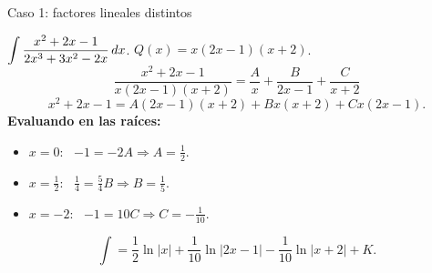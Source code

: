\documentclass[10pt,aspectratio=169]{beamer}
\begin{document}
\begin{frame}{Caso 1: factores lineales distintos}
  \begin{ejemplo}[2]
    $\displaystyle\int\frac{x^2+2x-1}{2x^3+3x^2-2x}\,dx$. \quad $Q(x)=x(2x-1)(x+2)$.
    \[ \frac{x^2+2x-1}{x(2x-1)(x+2)}=\frac Ax+\frac B{2x-1}+\frac C{x+2} \]
    \[ x^2+2x-1=A(2x-1)(x+2)+Bx(x+2)+Cx(2x-1). \]
    \textbf{Evaluando en las raíces:}
    \begin{itemize}
      \item $x=0$: \ $-1=-2A\Rightarrow A=\tfrac12$.
      \item $x=\tfrac12$: \ $\tfrac14=\tfrac54B\Rightarrow B=\tfrac15$.
      \item $x=-2$: \ $-1=10C\Rightarrow C=-\tfrac1{10}$.
    \end{itemize}
    \[ \int=\frac12\ln|x|+\frac1{10}\ln|2x-1|-\frac1{10}\ln|x+2|+K. \]
  \end{ejemplo}
\end{frame}
\end{document}

